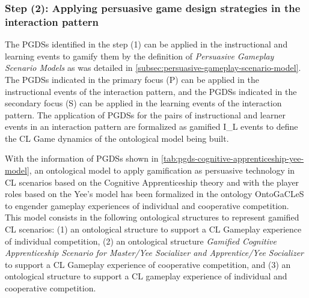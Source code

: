 \subsubsection*{Step (2): Applying persuasive game design strategies in the interaction pattern}

The PGDSs identified in the step (1) can be applied in the instructional and learning events to gamify them by the definition of \emph{Persuasive Gameplay Scenario Models} as was detailed in \autoref{subsec:persuasive-gameplay-scenario-model}. The PGDSs indicated in the primary focus (P) can be applied in the instructional events of the interaction pattern, and the PGDSs indicated in the secondary focus (S) can be applied in the learning events of the interaction pattern. The application of PGDSs for the pairs of instructional and learner events in an interaction pattern are formalized as gamified I\_L events to define the CL Game dynamics of the ontological model being built.

With the information of PGDSs shown in \autoref{tab:pgds-cognitive-apprenticeship-yee-model}, an ontological model to apply gamification as persuasive technology in CL scenarios based on the Cognitive Apprenticeship theory and with the player roles based on the Yee's model has been formalized in the ontology OntoGaCLeS to engender gameplay experiences of individual and cooperative competition. This model consists in the following ontological structures to represent gamified CL scenarios: (1) an ontological structure  to support a CL Gameplay experience of individual competition, (2) an ontological structure {\emph{Gamified Cognitive Apprenticeship Scenario for Master/Yee Socializer and Apprentice/Yee Socializer}} to support a CL Gameplay experience of cooperative competition, and (3) an ontological structure  to support a CL gameplay experience of individual and cooperative competition. 

